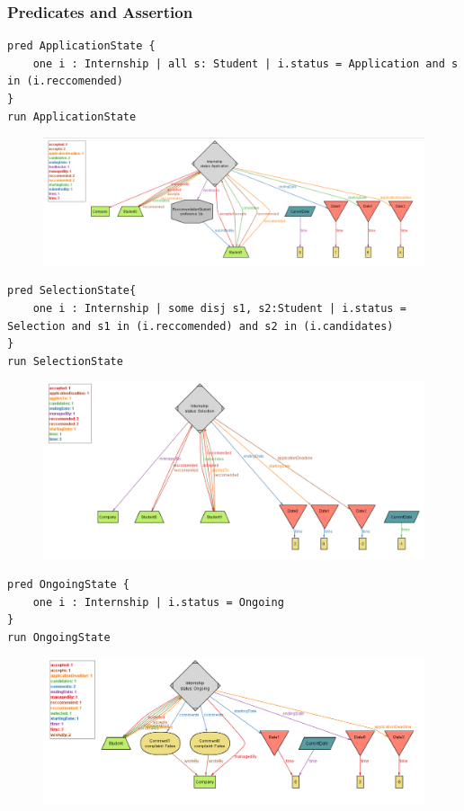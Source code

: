 \documentclass{article}
\begin{document}
\subsubsection{Predicates and Assertion}
\begin{lstlisting}
pred ApplicationState {
    one i : Internship | all s: Student | i.status = Application and s in (i.reccomended)
}
run ApplicationState
\end{lstlisting}
\begin{figure}[H]
    \centering
    \includegraphics[scale = 0.42]{figures/alloy/app_state_1.png}
    \centering
\end{figure}
\begin{lstlisting}
pred SelectionState{
    one i : Internship | some disj s1, s2:Student | i.status = Selection and s1 in (i.reccomended) and s2 in (i.candidates)  
}
run SelectionState
\end{lstlisting}
\begin{figure}[H]
    \centering
    \includegraphics[scale = 0.42]{figures/alloy/selects_2.png}
    \centering
\end{figure}
\begin{lstlisting}
pred OngoingState {
    one i : Internship | i.status = Ongoing
}
run OngoingState
\end{lstlisting}
\begin{figure}[H]
    \centering
    \includegraphics[scale = 0.42]{figures/alloy/ongoing_state.png}
    \centering
\end{figure}
\end{document}
